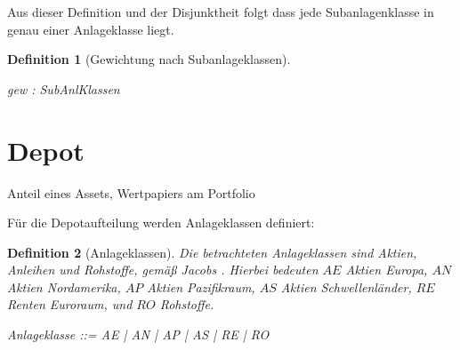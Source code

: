 \documentclass[12pt]{scrartcl}
\newtheorem{genericdef}{Generic Definition}[section]
\newtheorem{zdef}{Definition}[section]
\newcommand{\dsum}{\Sigma}
\begin{document}
Aus dieser Definition und der Disjunktheit folgt dass jede
Subanlagenklasse in genau einer Anlageklasse liegt.  

\begin{zdef}[Gewichtung nach Subanlageklassen]
  \label{zdef:gewichtung-subanlageklassen}
  \begin{axdef}
    gew : SubAnlKlassen \fun \rat \\
  \end{axdef}
\end{zdef}

\section{Depot}
\label{sec:depot}
Anteil eines Assets, Wertpapiers am Portfolio


Für die Depotaufteilung werden Anlageklassen definiert:

\begin{zdef}[Anlageklassen]
  \label{zdef:anlageklassen}
  Die betrachteten Anlageklassen sind Aktien, Anleihen und Rohstoffe,
  gemäß Jacobs \cite{Jacobs2016}. Hierbei bedeuten $AE$ Aktien Europa,
  $AN$ Aktien Nordamerika, $AP$ Aktien Pazifikraum, $AS$ Aktien
  Schwellenländer, $RE$ Renten Euroraum, und $RO$ Rohstoffe. 
  \begin{zed}
    Anlageklasse ::= AE | AN | AP | AS | RE | RO 
  \end{zed}
\end{zdef}


\end{document}
